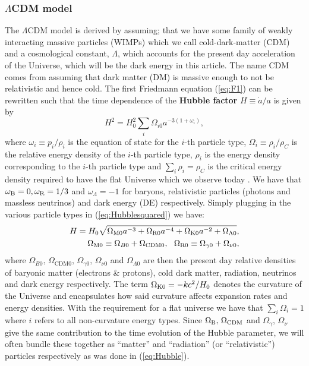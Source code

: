 \documentclass[%
reprint,
 amsmath,amssymb,
 aps,
]{revtex4-2}
\begin{document}
\subsubsection{$\Lambda$CDM model}
The $\Lambda$CDM model is derived by assuming; that we have some family of weakly interacting massive particles (WIMPs) which we call cold-dark-matter (CDM) and a cosmological constant, $\Lambda$, which accounts for the present day acceleration of the Universe, which will be the dark energy in this article. The name CDM comes from assuming that dark matter (DM) is massive enough to not be relativistic and hence cold. 
The first Friedmann equation (\ref{eq:F1}) can be rewritten such that the time dependence of the \textbf{Hubble factor} $H\equiv\dot{a}/a$ is given by
\begin{equation}
	H^2=H_0^2\sum_i\Omega_{i0}a^{-3(1+\omega_i)},
	\label{eq:Hubblesquared}
\end{equation}
where $\omega_i\equiv p_i/\rho_i$ is the equation of state for the $i$-th particle type, $\Omega_i\equiv\rho_i/\rho_C$ is the relative energy density of the $i$-th particle type, $\rho_i$ is the energy density corresponding to the $i$-th particle type and $\sum_i\rho_i=\rho_C$ is the critical energy density required to have the flat Universe which we observe today \cite{Planck:2018vyg}. We have that $\omega_{\text B}=0,\omega_{\text{R}}=1/3$ and $\omega_\Lambda=-1$ for baryons, relativistic particles (photons and massless neutrinos) and dark energy (DE) respectively. Simply plugging in the various particle types in (\ref{eq:Hubblesquared}) we have:
\begin{align}
	H=H_0\sqrt{\Omega_{\text M0}a^{-3}+\Omega_{\text{R}0}a^{-4}+\Omega_{\text K0}a^{-2}+\Omega_{\Lambda0}}, 
	\label{eq:Hubble}\\
	\Omega_{\text M0}\equiv \Omega_{B0}+\Omega_{\text{CDM}0},~~\Omega_{\text{R}0}\equiv \Omega_{\gamma0}+\Omega_{\nu0},\nonumber
\end{align}
where $\Omega_{B0},\,\Omega_{\text{CDM}0},\,\Omega_{\gamma0},\,\Omega_{\nu0}$ and $\Omega_{\Lambda0}$ are then the present day relative densities of baryonic matter (electrons \& protons), cold dark matter, radiation, neutrinos and dark energy respectively. The term $\Omega_{\text K0}=-kc^2/H_0$ denotes the curvature of the Universe and encapsulates how said curvature affects expansion rates and energy densities. With the requirement for a flat universe we have that $\sum_i\Omega_i=1$ where $i$ refers to all non-curvature energy types. Since $\Omega_{\text B},\,\Omega_{\text{CDM}}$ and $\Omega_\gamma,\,\Omega_\nu$ give the same contribution to the time evolution of the Hubble parameter, we will often bundle these together as ``matter'' and ``radiation'' (or ``relativistic'') particles respectively as was done in (\ref{eq:Hubble}).
\end{document}
